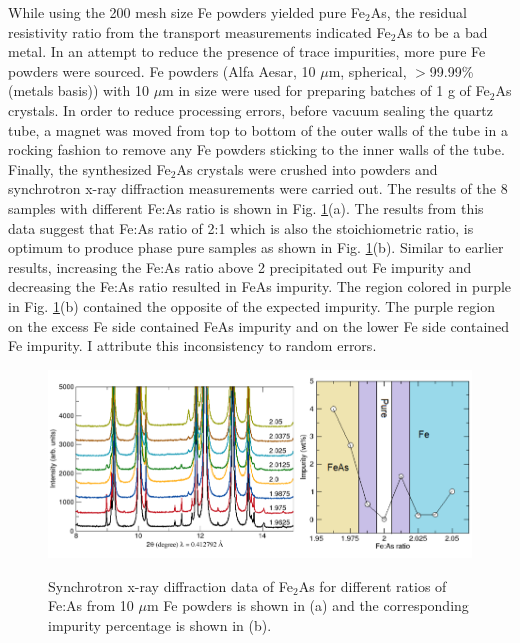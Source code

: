 \documentclass[letterpaper,10pt,doublespacing,edeposit]{uiucthesis2020}
\begin{document}
\begin{mainmatter}
While using the 200 mesh size Fe powders yielded pure Fe$_2$As, the residual resistivity ratio from the transport measurements indicated Fe$_2$As to be a bad metal. In an attempt to reduce the presence of trace impurities, more pure Fe powders were sourced. Fe powders (Alfa Aesar, 10 $\mu$m, spherical, $>$99.99\% (metals basis)) with 10 $\mu$m in size were used for preparing batches of 1 g of Fe$_2$As crystals. In order to reduce processing errors, before vacuum sealing the quartz tube, a magnet was moved from top to bottom of the outer walls of the tube in a rocking fashion to remove any Fe powders sticking to the inner walls of the tube. Finally, the synthesized Fe$_2$As crystals were crushed into powders and synchrotron x-ray diffraction measurements were carried out. The results of the 8 samples with different Fe:As ratio is shown in Fig. \ref{fig:Fe2As_ratio_2}(a). The results from this data suggest that Fe:As ratio of 2:1 which is also the stoichiometric ratio, is optimum to produce phase pure samples as shown in Fig. \ref{fig:Fe2As_ratio_2}(b). Similar to earlier results, increasing the Fe:As ratio above 2 precipitated out Fe impurity and decreasing the Fe:As ratio resulted in FeAs impurity. The region colored in purple in Fig. \ref{fig:Fe2As_ratio_2}(b) contained the opposite of the expected impurity. The purple region on the excess Fe side contained FeAs impurity and on the lower Fe side contained Fe impurity. I attribute this inconsistency to random errors.

\begin{figure}
\centering\includegraphics[width=\columnwidth]{figures/ch3/Fe2As_stoichiometry.png} \\
\caption{\label{fig:Fe2As_ratio_2}
Synchrotron x-ray diffraction data of Fe$_2$As for different ratios of Fe:As from 10 $\mu$m Fe powders is shown in (a) and the corresponding impurity percentage is shown in (b).
}
\end{figure}


\end{mainmatter}
\end{document}
